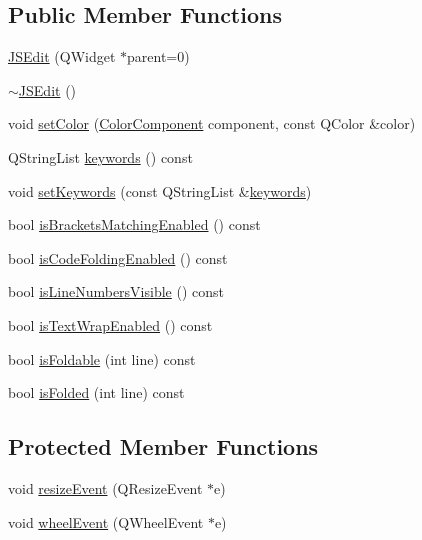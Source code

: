 \subsection*{Public Member Functions}
\begin{DoxyCompactItemize}
\item 
\hyperlink{class_j_s_edit_a8f9e2f3aa005871d8eb1a541b8e872cf}{J\+S\+Edit} (Q\+Widget $\ast$parent=0)
\item 
\hyperlink{class_j_s_edit_a53e969b73a8472fd0f22b504ea68fb29}{$\sim$\+J\+S\+Edit} ()
\item 
void \hyperlink{class_j_s_edit_a783833bb402b29457f3ec268e5a8ae57}{set\+Color} (\hyperlink{class_j_s_edit_a5a465193a1344e5be9b04f5ff7883213}{Color\+Component} component, const Q\+Color \&color)
\item 
Q\+String\+List \hyperlink{class_j_s_edit_af2a11c0f985403c3cf42143151688500}{keywords} () const
\item 
void \hyperlink{class_j_s_edit_a1a77f8ce932ed2654de4ad8a092d2754}{set\+Keywords} (const Q\+String\+List \&\hyperlink{class_j_s_edit_af2a11c0f985403c3cf42143151688500}{keywords})
\item 
bool \hyperlink{class_j_s_edit_a4a0ea37124129f1c18d84708c454834c}{is\+Brackets\+Matching\+Enabled} () const
\item 
bool \hyperlink{class_j_s_edit_a4ff46404c4277cf3d32b66ee26ff8965}{is\+Code\+Folding\+Enabled} () const
\item 
bool \hyperlink{class_j_s_edit_a72262886ceb0918384629a2cc813777c}{is\+Line\+Numbers\+Visible} () const
\item 
bool \hyperlink{class_j_s_edit_a7d397d0f91f3829d4897b103a7f238f1}{is\+Text\+Wrap\+Enabled} () const
\item 
bool \hyperlink{class_j_s_edit_aa9489a933ccc52750bbcac24d58d284c}{is\+Foldable} (int line) const
\item 
bool \hyperlink{class_j_s_edit_af06c6789b9046e6b42ec34e94820291b}{is\+Folded} (int line) const
\end{DoxyCompactItemize}
\subsection*{Protected Member Functions}
\begin{DoxyCompactItemize}
\item 
void \hyperlink{class_j_s_edit_a3c5fb615d94f736ce8fdbc6288d3d2f8}{resize\+Event} (Q\+Resize\+Event $\ast$e)
\item 
void \hyperlink{class_j_s_edit_a66017f13ed0ae775050bfe3e89afd407}{wheel\+Event} (Q\+Wheel\+Event $\ast$e)
\end{DoxyCompactItemize}
